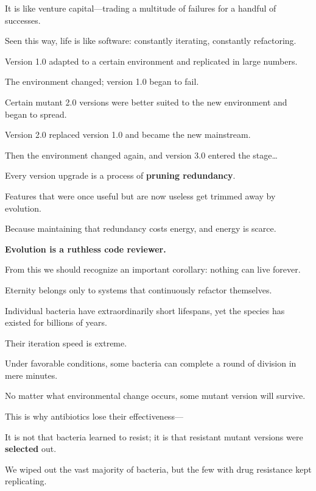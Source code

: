 It is like venture capital---trading a multitude of failures for a handful of successes.

\vspace{1em}

Seen this way, life is like software: constantly iterating, constantly refactoring.

Version 1.0 adapted to a certain environment and replicated in large numbers.

The environment changed; version 1.0 began to fail.

Certain mutant 2.0 versions were better suited to the new environment and began to spread.

Version 2.0 replaced version 1.0 and became the new mainstream.

Then the environment changed again, and version 3.0 entered the stage\ldots

\vspace{1em}

Every version upgrade is a process of \textbf{pruning redundancy}.

Features that were once useful but are now useless get trimmed away by evolution.

Because maintaining that redundancy costs energy, and energy is scarce.

\textbf{Evolution is a ruthless code reviewer.}

From this we should recognize an important corollary: nothing can live forever.

Eternity belongs only to systems that continuously refactor themselves.

\vspace{1em}

Individual bacteria have extraordinarily short lifespans, yet the species has existed for billions of years.

Their iteration speed is extreme.

Under favorable conditions, some bacteria can complete a round of division in mere minutes.

No matter what environmental change occurs, some mutant version will survive.

This is why antibiotics lose their effectiveness---

It is not that bacteria learned to resist; it is that resistant mutant versions were \textbf{selected} out.

We wiped out the vast majority of bacteria, but the few with drug resistance kept replicating.

